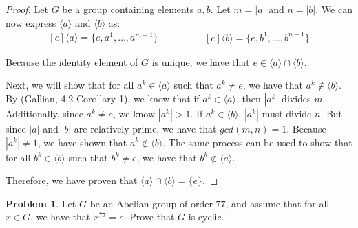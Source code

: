 \documentclass[12pt,reqno]{article}
\theoremstyle{plain}
\theoremstyle{definition}
\newtheorem{problem}{Problem}
\begin{document}
\begin{proof}
    Let \(G\) be a group containing elements \(a,b\). Let \(m=|a|\) and \(n=|b|\). We can now express \(\langle a\rangle\) and \(\langle b\rangle\) as:
    \begin{equation*}
        \begin{aligned}[c]
            \langle a\rangle = \{e,a^1,\ldots,a^{m-1}\}
        \end{aligned}
        \qquad\qquad
        \begin{aligned}[c]
            \langle b\rangle = \{e,b^1,\ldots,b^{n-1}\}
        \end{aligned}
    \end{equation*}
    
    Because the identity element of \(G\) is unique, we have that \(e\in\langle a\rangle\cap\langle b\rangle\).
    
    Next, we will show that for all \(a^k\in\langle a\rangle\) such that \(a^k\neq e\), we have that \(a^k\notin\langle b\rangle\).
    By (Gallian, 4.2 Corollary 1), we know that if \(a^k\in\langle a\rangle\), then \(|a^k|\) divides \(m\). Additionally, since \(a^k\neq e\),
    we know \(|a^k|>1\). If \(a^k\in\langle b\rangle\), \(|a^k|\) must divide \(n\). But since \(|a|\) and \(|b|\) are relatively prime, we have that \(gcd(m,n)=1\). Because
    \(|a^k|\neq 1\), we have shown that \(a^k\notin\langle b\rangle\). The same process can be used to show that for all \(b^k\in\langle b\rangle\) such that \(b^k\neq e\),
    we have that \(b^k\notin\langle a\rangle\).

    Therefore, we have proven that \(\langle a\rangle\cap\langle b\rangle=\{e\}\).
\end{proof}

\newpage


\begin{problem}
    Let \(G\) be an Abelian group of order \(77\), and assume that for all \(x\in G\), we have that
    \(x^{77}=e\). Prove that \(G\) is cyclic.
\end{problem}
\end{document}
